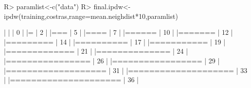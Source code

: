 \documentclass[nojss,shortnames]{jss}
\begin{document}
\begin{Schunk}
\begin{Sinput}
R> paramlist<-c("data")
R> final.ipdw<-ipdw(training,costras,range=mean.neighdist*10,paramlist)
\end{Sinput}
\begin{Soutput}
  |                                                                  
  |                                                            |   0%
  |                                                                  
  |=                                                           |   2%
  |                                                                  
  |===                                                         |   5%
  |                                                                  
  |====                                                        |   7%
  |                                                                  
  |======                                                      |  10%
  |                                                                  
  |=======                                                     |  12%
  |                                                                  
  |=========                                                   |  14%
  |                                                                  
  |==========                                                  |  17%
  |                                                                  
  |===========                                                 |  19%
  |                                                                  
  |=============                                               |  21%
  |                                                                  
  |==============                                              |  24%
  |                                                                  
  |================                                            |  26%
  |                                                                  
  |=================                                           |  29%
  |                                                                  
  |===================                                         |  31%
  |                                                                  
  |====================                                        |  33%
  |                                                                  
  |=====================                                       |  36%
  |                                                                  

\end{Soutput}
\end{Schunk}
\end{document}
